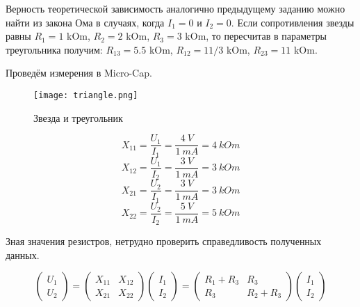     \noindent Верность теоретической зависимость аналогично предыдущему 
    заданию можно найти из закона Ома в случаях, когда $I_1 = 0$ и $I_2 = 0$.
    Если сопротивления звезды равны $R_1 = 1$ kOm, $R_2 = 2$ kOm, 
    $R_3 = 3$ kOm, то пересчитав в параметры треугольника получим:
    $R_{13} = 5.5$ kOm, $R_{12} = 11/3$ kOm, $R_{23} = 11$ kOm.

    \newpage
    
    \noindent Проведём измерения в Micro-Cap.
    \begin{figure}[h!]
        \centering
        \texttt{[image: triangle.png]}
        \caption{Звезда и треугольник}
    \end{figure}

    \[ X_{11} = \frac{U_1}{I_1} = \frac{4 ~ V}{1 ~ mA} = 4 ~ kOm \]
    \[ X_{12} = \frac{U_1}{I_2} = \frac{3 ~ V}{1 ~ mA} = 3 ~ kOm \]
    \[ X_{21} = \frac{U_2}{I_1} = \frac{3 ~ V}{1 ~ mA} = 3 ~ kOm \]
    \[ X_{22} = \frac{U_2}{I_2} = \frac{5 ~ V}{1 ~ mA} = 5 ~ kOm \]

    \noindent Зная значения резистров, нетрудно проверить справедливость полученных данных.

    \begin{equation*}
        \left(
        \begin{array}{c}
            U_1\\
            U_2
        \end{array}
        \right) =
        \left(
        \begin{array}{cc}
            X_{11} & X_{12}\\
            X_{21} & X_{22}
        \end{array}
        \right)
        \left(
        \begin{array}{c}
            I_1\\
            I_2
        \end{array}
        \right) =
        \left(
        \begin{array}{cc}
            R_1 + R_3 & R_3      \\
            R_3       & R_2 + R_3
        \end{array}
        \right)
        \left(
        \begin{array}{c}
            I_1\\
            I_2
        \end{array}
        \right) 
    \end{equation*}

